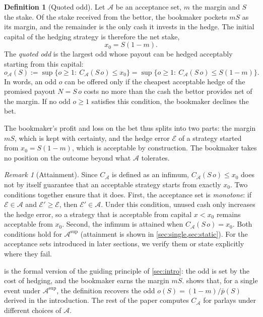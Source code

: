 \documentclass[11pt,a4paper]{article}
\theoremstyle{plain}
\theoremstyle{definition}
\newtheorem{definition}[theorem]{Definition}
\theoremstyle{remark}
\newtheorem{remark}[theorem]{Remark}
\newcommand{\1}{\mathbf{1}}
\begin{document}
\begin{definition}[Quoted odd]
\label{def:quote}
Let $\mathcal{A}$ be an acceptance set, $m$ the margin and $S$ the stake. Of the stake received from the bettor, the bookmaker pockets $mS$ as its margin, and the remainder is the only cash it invests in the hedge. The initial capital of the hedging strategy is therefore the net stake,
\[
x_0 = S(1-m).
\]
The \emph{quoted odd} is the largest odd whose payout can be hedged acceptably starting from this capital:
\[
o_{\mathcal{A}}(S) := \sup\bigl\{o\geq 1:\ C_{\mathcal{A}}(S\,o)\leq x_0\bigr\} = \sup\bigl\{o\geq 1:\ C_{\mathcal{A}}(S\,o)\leq S(1-m)\bigr\}.
\]
In words, an odd $o$ can be offered only if the cheapest acceptable hedge of the promised payout $N=S\,o$ costs no more than the cash the bettor provides net of the margin. If no odd $o\geq 1$ satisfies this condition, the bookmaker declines the bet.
\end{definition}

The bookmaker's profit and loss on the bet thus splits into two parts: the margin $mS$, which is kept with certainty, and the hedge error $\mathcal{E}$ of a strategy started from $x_0 = S(1-m)$, which is acceptable by construction. The bookmaker takes no position on the outcome beyond what $\mathcal{A}$ tolerates.

\begin{remark}[Attainment]
\label{rem:attainment}
Since $C_{\mathcal{A}}$ is defined as an infimum, $C_{\mathcal{A}}(S\,o)\leq x_0$ does not by itself guarantee that an acceptable strategy starts from exactly $x_0$. Two conditions together ensure that it does. First, the acceptance set is \emph{monotone}: if $\mathcal{E}\in\mathcal{A}$ and $\mathcal{E}'\geq\mathcal{E}$, then $\mathcal{E}'\in\mathcal{A}$. Under this condition, unused cash only increases the hedge error, so a strategy that is acceptable from capital $x<x_0$ remains acceptable from $x_0$. Second, the infimum is attained when $C_{\mathcal{A}}(S\,o)=x_0$. Both conditions hold for $\mathcal{A}^{\mathrm{sup}}$ (attainment is shown in \cref{sec:single,sec:static}). For the acceptance sets introduced in later sections, we verify them or state explicitly where they fail.
\end{remark}

 is the formal version of the guiding principle of \cref{sec:intro}: the odd is set by the cost of hedging, and the bookmaker earns the margin $mS$.  shows that, for a single event under $\mathcal{A}^{\mathrm{sup}}$, the definition recovers the odd $o(S) = (1-m)/\bar p(S)$ derived in the introduction. The rest of the paper computes $C_{\mathcal{A}}$ for parlays under different choices of $\mathcal{A}$.
\end{document}
